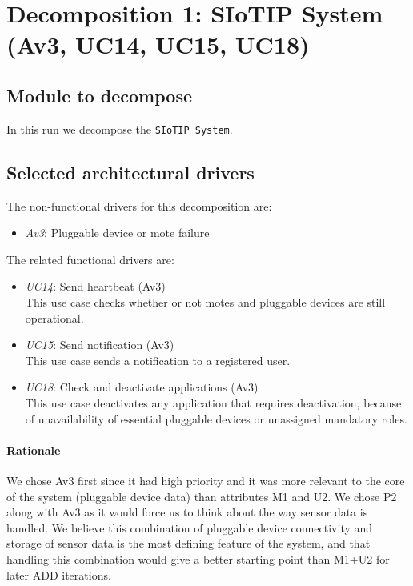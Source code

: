 \section{Decomposition 1: SIoTIP System (Av3, UC14, UC15, UC18)}

\subsection{Module to decompose}
    In this run we decompose the \texttt{SIoTIP System}.


\subsection{Selected architectural drivers}
    The non-functional drivers for this decomposition are:
    \begin{itemize}
    	\item \emph{Av3}: Pluggable device or mote failure
    \end{itemize}

    \noindent The related functional drivers are:
    \begin{itemize}
    	\item \emph{UC14}: Send heartbeat (Av3) \\
              This use case checks whether or not motes and pluggable devices
              are still operational.
    	\item \emph{UC15}: Send notification (Av3) \\
              This use case sends a notification to a registered user.
    	\item \emph{UC18}: Check and deactivate applications (Av3) \\
              This use case deactivates any application that requires deactivation,
              because of unavailability of essential pluggable devices
              or unassigned mandatory roles.
    \end{itemize}

    \paragraph{Rationale}
        We chose Av3 first since it had high priority and it was more relevant to
        the core of the system (pluggable device data) than attributes M1 and U2. We
        chose P2 along with Av3 as it would force us to think about the way
        sensor data is handled. We believe this combination of pluggable device connectivity and
        storage of sensor data is the most defining feature of the system, and that
        handling this combination would give a better starting point than M1+U2
        for later ADD iterations.



